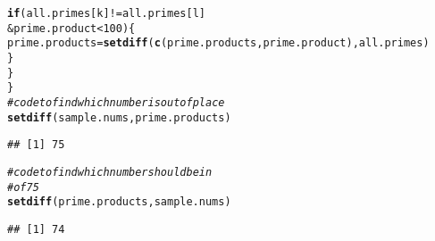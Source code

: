 \documentclass{article}\usepackage[]{graphicx}\usepackage[]{xcolor}
\makeatletter
\newcommand{\hlnum}[1]{\textcolor[rgb]{0.686,0.059,0.569}{#1}}%
\newcommand{\hlcom}[1]{\textcolor[rgb]{0.678,0.584,0.686}{\textit{#1}}}%
\newcommand{\hlopt}[1]{\textcolor[rgb]{0,0,0}{#1}}%
\newcommand{\hldef}[1]{\textcolor[rgb]{0.345,0.345,0.345}{#1}}%
\newcommand{\hlkwa}[1]{\textcolor[rgb]{0.161,0.373,0.58}{\textbf{#1}}}%
\newcommand{\hlkwb}[1]{\textcolor[rgb]{0.69,0.353,0.396}{#1}}%
\newcommand{\hlkwd}[1]{\textcolor[rgb]{0.737,0.353,0.396}{\textbf{#1}}}%
\newenvironment{kframe}{%
 \def\at@end@of@kframe{}%
 \ifinner\ifhmode%
  \def\at@end@of@kframe{\end{minipage}}%
  \begin{minipage}{\columnwidth}%
 \fi\fi%
 \def\FrameCommand##1{\hskip\@totalleftmargin \hskip-\fboxsep
 \colorbox{shadecolor}{##1}\hskip-\fboxsep
     \hskip-\linewidth \hskip-\@totalleftmargin \hskip\columnwidth}%
 \MakeFramed {\advance\hsize-\width
   \@totalleftmargin\z@ \linewidth\hsize
   \@setminipage}}%
 {\par\unskip\endMakeFramed%
 \at@end@of@kframe}
\newenvironment{knitrout}{}{} %
\makeatother
\begin{document}
\begin{enumerate}
\begin{knitrout}
\begin{kframe}
\begin{alltt}
    \hlkwa{if} \hldef{(all.primes[k]} \hlopt{!=} \hldef{all.primes[l]}
        \hlopt{&} \hldef{prime.product} \hlopt{<} \hlnum{100}\hldef{)\{}
      \hldef{prime.products} \hlkwb{=} \hlkwd{setdiff}\hldef{(}\hlkwd{c}\hldef{(prime.products, prime.product), all.primes)}
    \hldef{\}}
  \hldef{\}}
\hldef{\}}
\hlcom{# code to find which number is out of place }
\hlkwd{setdiff}\hldef{(sample.nums, prime.products)}
\end{alltt}
\begin{verbatim}
## [1] 75
\end{verbatim}
\begin{alltt}
\hlcom{# code to find which number should be in}
\hlcom{# of 75}
\hlkwd{setdiff}\hldef{(prime.products, sample.nums)}
\end{alltt}
\begin{verbatim}
## [1] 74
\end{verbatim}
\end{kframe}
\end{knitrout}
\end{enumerate}


\end{document}
